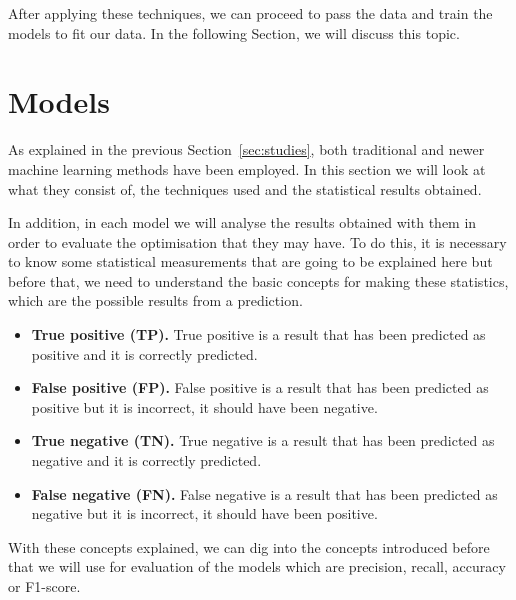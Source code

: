 After applying these techniques, we can proceed to pass the data and train the models to fit our data. In the following Section, we will discuss this topic.

\section{Models}
As explained in the previous Section~\ref{sec:studies}, both traditional and newer machine learning methods have been employed. In this section we will look at what they consist of, the techniques used and the statistical results obtained.

In addition, in each model we will analyse the results obtained with them in order to evaluate the optimisation that they may have. To do this, it is necessary to know some statistical measurements that are going to be explained here but before that, we need to understand the basic concepts for making these statistics, which are the possible results from a prediction.
\begin{itemize}
    \item\textbf{ True positive (TP).} True positive is a result that has been predicted as positive and it is correctly predicted.
    \item\textbf{ False positive (FP).} False positive is a result that has been predicted as positive but it is incorrect, it should have been negative. 
    \item \textbf{True negative (TN).} True negative is a result that has been predicted as negative and it is correctly predicted. 
    \item \textbf{False negative (FN).} False negative is a result that has been predicted as negative but it is incorrect, it should have been positive.
\end{itemize}

With these concepts explained, we can dig into the concepts introduced before that we will use for evaluation of the models which are precision, recall, accuracy or F1-score.

